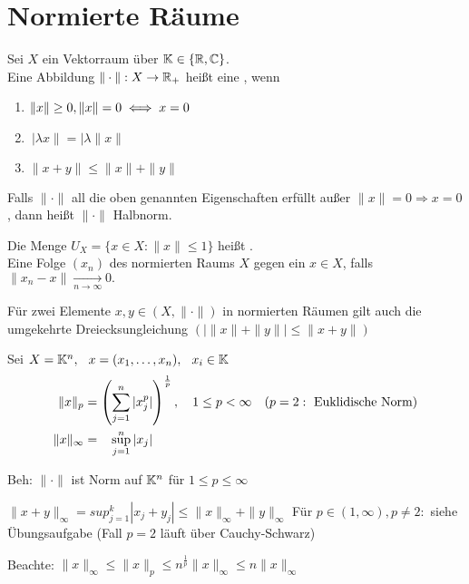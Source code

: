 
\chapter{Normierte R{\"a}ume}

\begin{definition}
Sei $X$ ein Vektorraum über $\mathbb{K} \in\{ \mathbb{R}, \mathbb{C} \}$. \\
Eine Abbildung  $\| \cdot \|: X \rightarrow \mathbb{R}_{+}$ hei{\ss}t eine , wenn
\begin{enumerate}
	\item $ \| x \| \geq 0, \| x \| = 0 \iff x = 0 $
	\item $\ | \lambda x \| = | \lambda \| x \| $
	\item $ \| x + y \| \leq \| x \| + \| y \| $
\end{enumerate}	
\end{definition}

\begin{bemerkung} Falls $ \| \cdot \| $ all die oben genannten Eigenschaften erfüllt au{\ss}er $ \| x \| = 0 \Rightarrow x = 0 $, dann hei{\ss}t $ \| \cdot \| $ Halbnorm.
\end{bemerkung}

\begin{vereinbarung}
Die Menge $ U_{X} = \{ x \in X:  \|x \| \leq 1 \}$ hei{\ss}t . \\
Eine Folge $(x_{n})$ des normierten Raums $X$  gegen ein $ x \in X $, falls  $\| x_{n} - x \| \xrightarrow[n \rightarrow \infty]{} 0. $	
\end{vereinbarung}


\begin{bemerkung}
Für zwei Elemente $x, y \in (X, \| \cdot \|)$ in normierten Räumen gilt auch die umgekehrte Dreiecksungleichung $( | \| x \| + \| y \| | \leq \| x + y \|)$
\end{bemerkung}

\begin{beispiel}
Sei $ X = \mathbb{K}^{n}, \hspace{0.25cm} x = ( x_{1}, \dotsc, x_{n}), \hspace{0.25cm} x_{i} \in \mathbb{K}$ 
\begin{align*}
	\| x \|_{p} & = \left( \sum_{j = 1}^{n} |x_{j}^{p}| \right)^{\frac{1}{p}}, \quad 1 \leq p < \infty \quad (p = 2: \text{ Euklidische Norm}) \\
	\| x \|_{\infty} & = \hspace{0.3cm} \sup_{j = 1}^{n} |x_{j}|	
\end{align*}

Beh: $\| \cdot \| $ ist Norm auf $\mathbb{K}^n$ für $1 \leq p \leq \infty$

$\| x + y \|_{\infty} = sup_{j = 1}^{k} |x_{j} + y_{j}| \leq \|x\|_{\infty} + \|y\|_{\infty} $
Für $p \in (1, \infty), p \neq 2:$ siehe Übungsaufgabe (Fall $p = 2$ läuft über Cauchy-Schwarz)

Beachte: $\|x\|_{\infty} \leq  \|x\|_{p} \leq n^{\frac{1}{p}} \|x\|_{\infty} \leq n \| x \|_{\infty}$
\end{beispiel}

